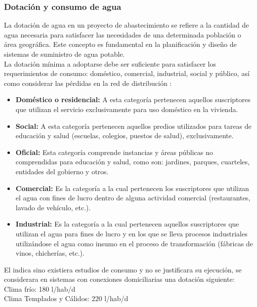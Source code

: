         \subsubsection{Dotación y consumo de agua}
            La dotación de agua en un proyecto de abastecimiento se refiere a la cantidad de agua necesaria para satisfacer las necesidades de una determinada población o área geográfica. Este concepto es fundamental en la planificación y diseño de sistemas de suministro de agua potable.\\ 
            La dotación mínima a adoptarse debe ser suficiente para satisfacer los requerimientos de consumo: doméstico, comercial, industrial, social y público, así como considerar las pérdidas en la red de distribución \parencite{magne2008abastecimiento}:\\ 
            \begin{itemize}
                \item \textbf{Doméstico o residencial:} A esta categoría pertenecen aquellos suscriptores que utilizan el servicio exclusivamente para uso doméstico en la vivienda.
                \item \textbf{Social:} A esta categoría pertenecen aquellos predios utilizados para tareas de educación y salud (escuelas, colegios, puestos de salud), exclusivamente.
                \item \textbf{Oficial:} Esta categoría comprende instancias y áreas públicas no comprendidas para educación y salud, como son: jardines, parques, cuarteles, entidades del gobierno y otros.
                \item \textbf{Comercial:} Es la categoría a la cual pertenecen los suscriptores que utilizan el agua con fines de lucro dentro de alguna actividad comercial (restaurantes, lavado de vehículo, etc.).
                \item \textbf{Industrial:} Es la categoría a la cual pertenecen aquellos suscriptores que utilizan el agua para fines de lucro y en los que se lleva procesos industriales utilizándose el agua como insumo en el proceso de transformación (fábricas de vinos, chicherías, etc.).
            \end{itemize}
            
            El \textcite{os100} indica sino existiera estudios de consumo y no se justificara su ejecución, se considerara en sistemas con conexiones domiciliarias una dotación siguiente:\\ 
            Clima frío: 180 l/hab/d\\ 
            Clima Templados y Cálidos: 220 l/hab/d \\ 
            
